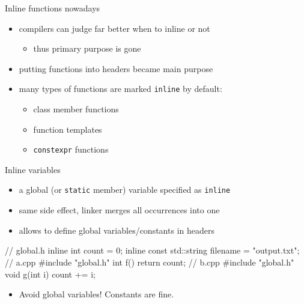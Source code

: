 \begin{frame}[fragile]
  \begin{block}{Inline functions nowadays}
    \begin{itemize}
      \item compilers can judge far better when to inline or not
        \begin{itemize}
        \item thus primary purpose is gone
        \end{itemize}
      \item putting functions into headers became main purpose
      \item many types of functions are marked \texttt{inline} by default:
      \begin{itemize}
        \item class member functions
        \item function templates
        \item \texttt{constexpr} functions
      \end{itemize}
    \end{itemize}
  \end{block}
\end{frame}

\begin{frame}[fragile]
  \begin{block}{Inline variables}
    \begin{itemize}
      \item a global (or \texttt{static} member) variable specified as \texttt{inline}
      \item same side effect, linker merges all occurrences into one
      \item allows to define global variables/constants in headers
    \end{itemize}
  \end{block}
  \begin{block}{}
    \small
    \begin{cppcode*}{}
      // global.h
      inline int count = 0;
      inline const std::string filename = "output.txt";
      // a.cpp
      #include "global.h"
      int f() { return count; }
      // b.cpp
      #include "global.h"
      void g(int i) { count += i; }
    \end{cppcode*}
  \end{block}
  \begin{alertblock}{}
    \begin{itemize}
      \item Avoid global variables! Constants are fine.
    \end{itemize}
  \end{alertblock}
\end{frame}
